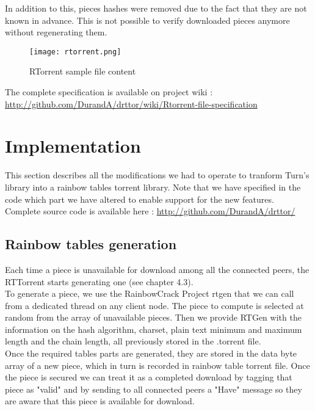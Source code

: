 \documentclass[a4paper]{article}
\begin{document}
{In addition to this, pieces hashes were removed due to the fact that they are not known in advance. This is not possible to verify downloaded pieces anymore without regenerating them.

\vspace{2mm}
\begin{figure}[H]
  \centering
    \texttt{[image: rtorrent.png]}
    \caption{RTorrent sample file content}
    \label{principle}
\end{figure}
\vspace{2mm}

The complete specification is available on project wiki : \url{http://github.com/DurandA/drttor/wiki/Rtorrent-file-specification}

\section{Implementation}

This section describes all the modifications we had to operate to tranform Turn's library into a rainbow tables torrent library. Note that we have specified in the code which part we have altered to enable support for the new features.\\

Complete source code is available here : \url{http://github.com/DurandA/drttor/}

\subsection{Rainbow tables generation}

Each time a piece is unavailable for download among all the connected peers, the RTTorrent starts generating one (see chapter 4.3).\\

To generate a piece, we use the RainbowCrack Project rtgen that we can call from a dedicated thread on any client node. The piece to compute is selected at random from the array of unavailable pieces. Then we provide RTGen with the information on the hash algorithm, charset, plain text minimum and maximum length and the chain length, all previously stored in the .torrent file.\\

Once the required tables parts are generated, they are stored in the data byte array of a new piece, which in turn is recorded in rainbow table torrent file. Once the piece is secured we can treat it as a completed download by tagging that piece as "valid" and by sending to all connected peers a "Have" message so they are aware that this piece is available for download.

}
\end{document}
